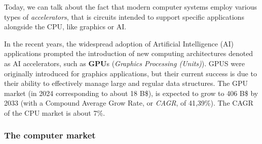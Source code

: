 \documentclass[a4paper,11pt]{article}
\begin{document}
Today, we can talk about the fact that modern computer systems employ various types of \textit{accelerators}, that is circuits intended to support specific applications alongside the CPU, like graphics or AI.

In the recent years, the widespread adoption of Artificial Intelligence (AI) applications prompted the introduction of new computing architectures denoted as AI accelerators, such as \textbf{GPU}s (\textit{Graphics Processing (Units)}).
GPUS were originally introduced for graphics applications, but their current success is due to their ability to effectively manage large and regular data structures.
The GPU market (in 2024 corresponding to about 18 B\$), is expected to grow to 406 B\$ by 2033 (with a Compound Average Grow Rate, or \textit{CAGR}, of 41,39\%). The CAGR of the CPU market is about 7\%.

\subsubsection{The computer market}
\end{document}
